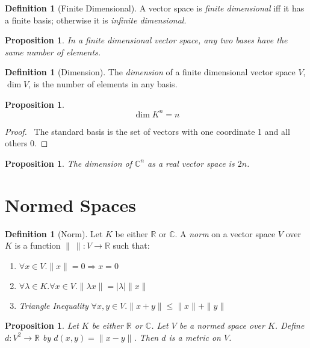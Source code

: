 \documentclass{book}
\let\qed\relax
\newtheorem{prop}[ax]{Proposition}
\theoremstyle{definition}
\newtheorem{df}[ax]{Definition}
\begin{document}
\begin{df}[Finite Dimensional]
A vector space is \emph{finite dimensional} iff it has a finite basis; otherwise it is \emph{infinite dimensional}.
\end{df}

\begin{prop}
In a finite dimensional vector space, any two bases have the same number of elements.
\end{prop}


\begin{df}[Dimension]
The \emph{dimension} of a finite dimensional vector space $V$, $\dim V$, is the number of elements in any basis.
\end{df}

\begin{prop}
\[ \dim K^n = n \]
\end{prop}

\begin{proof}
\pf\ The standard basis is the set of vectors with one coordinate 1 and all others 0. \qed
\end{proof}

\begin{prop}
The dimension of $\mathbb{C}^n$ as a real vector space is $2n$.
\end{prop}

\section{Normed Spaces}

\begin{df}[Norm]
Let $K$ be either $\mathbb{R}$ or $\mathbb{C}$.
A \emph{norm} on a vector space $V$ over $K$ is a function $\| \ \| : V \rightarrow \mathbb{R}$ such that:
\begin{enumerate}
\item $\forall x \in V. \| x \| = 0 \Rightarrow x = 0$
\item $\forall \lambda \in K. \forall x \in V. \| \lambda x \| = |\lambda| \| x \|$
\item \emph{Triangle Inequality} $\forall x,y \in V. \| x + y \| \leq \| x \| + \| y \|$
\end{enumerate}
\end{df}

\begin{prop}
Let $K$ be either $\mathbb{R}$ or $\mathbb{C}$. Let $V$ be a normed space over $K$. Define $d : V^2 \rightarrow \mathbb{R}$ by $d(x,y) = \| x-y \|$. Then $d$ is a metric on $V$.
\end{prop}
\end{document}
